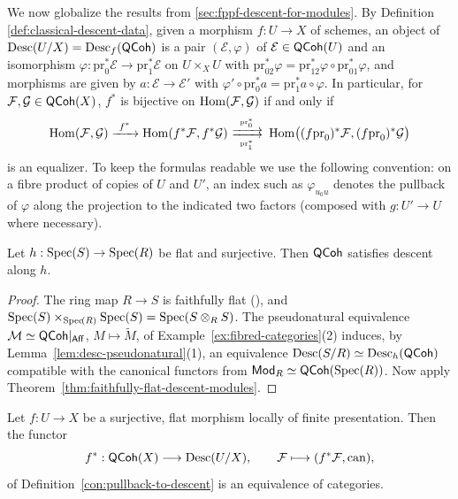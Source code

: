 We now globalize the results from \ref{sec:fppf-descent-for-modules}. By Definition \ref{def:classical-descent-data}, given a morphism $f:U\to X$ of schemes, an object of $\operatorname{Desc}(U/X)=\operatorname{Desc}_f(\mathsf{QCoh})$ is a pair $(\mathcal{E},\varphi)$ of $\mathcal{E}\in\mathsf{QCoh}(U)$ and an isomorphism $\varphi:\mathrm{pr}_0^*\mathcal{E}\to\mathrm{pr}_1^*\mathcal{E}$ on $U\times_XU$ with $\mathrm{pr}_{02}^*\varphi=\mathrm{pr}_{12}^*\varphi\circ\mathrm{pr}_{01}^*\varphi$, and morphisms are given by $a:\mathcal{E}\to\mathcal{E}'$ with $\varphi'\circ\mathrm{pr}_0^*a=\mathrm{pr}_1^*a\circ\varphi$. In particular, for $\mathcal{F},\mathcal{G}\in\mathsf{QCoh}(X)$, $f^*$ is bijective on $\operatorname{Hom}(\mathcal{F},\mathcal{G})$ if and only if
\[
\Hom(\mathcal{F},\mathcal{G})\xrightarrow{\ f^*\ }\Hom(f^*\mathcal{F},f^*\mathcal{G})\ \substack{\xrightarrow{\ \mathrm{pr}_0^*\ }\\[-0.2em]\xrightarrow[\ \mathrm{pr}_1^*\ ]{}}\ \Hom\bigl((f\mathrm{pr}_0)^*\mathcal{F},(f\mathrm{pr}_0)^*\mathcal{G}\bigr)
\]
is an equalizer. To keep the formulas readable we use the following convention: on a fibre product of copies of $U$ and $U'$, an index such as $\varphi_{u_0u}$ denotes the pullback of $\varphi$ along the projection to the indicated two factors (composed with $g:U'\to U$ where necessary).


\begin{lemma}\label{lem:qcoh-descent-affine}
	Let $h:\operatorname{Spec}\!\left(S\right)\to\operatorname{Spec}\!\left(R\right)$ be flat and surjective. Then $\mathsf{QCoh}$ satisfies descent along $h$.
\end{lemma}

\begin{proof}
	The ring map $R\to S$ is faithfully flat (\cite[][Tag 00HQ]{stacks-project}), and $\operatorname{Spec}\!\left(S\right)\times_{\operatorname{Spec}\!\left(R\right)}\operatorname{Spec}\!\left(S\right)=\operatorname{Spec}\!\left(S\otimes_RS\right)$. The pseudonatural equivalence $\mathcal{M}\simeq\mathsf{QCoh}|_{\mathsf{Aff}}$, $M\mapsto\widetilde{M}$, of Example~\ref{ex:fibred-categories}(2) induces, by Lemma~\ref{lem:desc-pseudonatural}(1), an equivalence $\operatorname{Desc}(S/R)\simeq\operatorname{Desc}_h(\mathsf{QCoh})$ compatible with the canonical functors from $\mathsf{Mod}_R\simeq\mathsf{QCoh}(\operatorname{Spec}\!\left(R\right))$. Now apply Theorem~\ref{thm:faithfully-flat-descent-modules}.
\end{proof}


\begin{theorem}
	\label{thm:fppf-descent-qcoh}
	Let $f:U\to X$ be a surjective, flat morphism locally
	of finite presentation. Then the functor
	\[
	f^*:\mathsf{QCoh}(X)\longrightarrow\operatorname{Desc}(U/X),\qquad\mathcal{F}\longmapsto(f^*\mathcal{F},\mathrm{can}),
	\]
	of Definition~\ref{con:pullback-to-descent}
	is an equivalence of categories.
\end{theorem}


